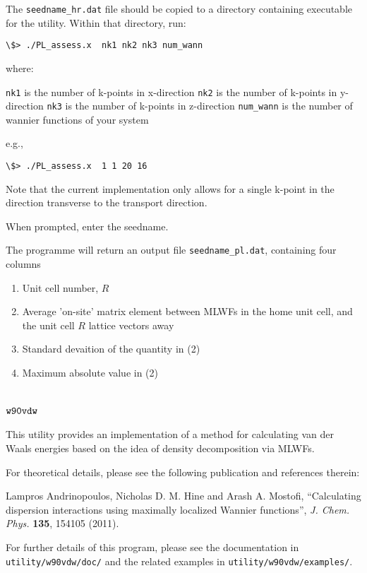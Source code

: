The \verb|seedname_hr.dat| file should be copied to a directory containing
executable for the utility. Within that directory, run:

\begin{verbatim}
\$> ./PL_assess.x  nk1 nk2 nk3 num_wann 
\end{verbatim}

where:

 \verb|nk1| is the number of k-points in x-direction
 \verb|nk2| is the number of k-points in y-direction
 \verb|nk3| is the number of k-points in z-direction
 \verb|num_wann| is the number of wannier functions of your system

e.g.,

\begin{verbatim} 
\$> ./PL_assess.x  1 1 20 16
\end{verbatim}

Note that the current implementation only allows for a single k-point
in the direction transverse to the transport direction.

When prompted, enter the seedname.

The programme will return an output file \verb|seedname_pl.dat|, containing four columns
\begin{enumerate}
        \item Unit cell number, $R$
        \item Average 'on-site' matrix element between MLWFs in 
             the home unit cell, and the unit cell $R$ lattice
             vectors away
        \item Standard devaition of the quantity in (2)
        \item Maximum absolute value in (2)
\end{enumerate}

\section{$\tt{w90vdw}$}
\label{sec:w90vdw}

This utility provides an implementation of a method for calculating
van der Waals energies based on the idea of density decomposition via
MLWFs. 

For theoretical details, please see the following publication
and references therein:

Lampros Andrinopoulos, Nicholas D. M. Hine and Arash A. Mostofi, 
``Calculating dispersion interactions using maximally localized
Wannier functions'', \emph{J. Chem. Phys.} \textbf{135}, 154105 (2011).

For further details of this program, please see the documentation
in \verb|utility/w90vdw/doc/| and the related examples in
\verb|utility/w90vdw/examples/|.

